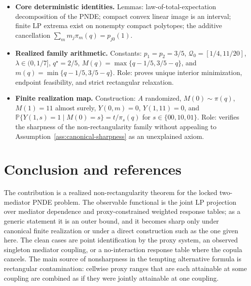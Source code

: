 \documentclass[11pt]{article}
\renewcommand{\Pr}{\mathbb{P}}
\theoremstyle{definition}
\theoremstyle{plain}
\theoremstyle{remark}
\begin{document}
\begin{itemize}[leftmargin=*]
\item \textbf{Core deterministic identities.}  Lemmas:
law-of-total-expectation decomposition of the PNDE; compact convex linear
image is an interval; finite LP extrema exist on nonempty compact polytopes;
the additive cancellation
\(\sum_m m_j\pi_m(q)=p_{j0}(1)\).

\item \textbf{Realized family arithmetic.}  Constants:
\(p_1=p_2=3/5\), \(\mathcal Q_0=[1/4,11/20]\),
\(\lambda\in(0,1/7]\), \(q^\star=2/5\),
\(M(q)=\max\{q-1/5,3/5-q\}\), and
\(m(q)=\min\{q-1/5,3/5-q\}\).  Role:
proves unique interior minimization, endpoint feasibility, and strict
rectangular relaxation.

\item \textbf{Finite realization map.}  Construction:
\(A\) randomized, \(M(0)\sim\pi(q)\), \(M(1)=11\) almost surely,
\(Y(0,m)=0\), \(Y(1,11)=0\), and
\(\Pr\{Y(1,s)=1\mid M(0)=s\}=t/\pi_s(q)\) for
\(s\in\{00,10,01\}\).  Role:
verifies the sharpness of the non-rectangularity family without appealing to
Assumption~\ref{ass:canonical-sharpness} as an unexplained axiom.
\end{itemize}

\section{Conclusion and references}
The contribution is a realized non-rectangularity theorem for the locked
two-mediator PNDE problem.  The observable functional is the joint LP
projection over mediator dependence and proxy-constrained weighted response
tables; as a generic statement it is an outer bound, and it becomes sharp only
under canonical finite realization or under a direct construction such as the
one given here.  The clean cases are point identification by the proxy system,
an observed singleton mediator coupling, or a no-interaction response table
where the copula cancels.  The main source of nonsharpness in the tempting
alternative formula is rectangular contamination: cellwise proxy ranges that
are each attainable at some coupling are combined as if they were jointly
attainable at one coupling.
\end{document}
